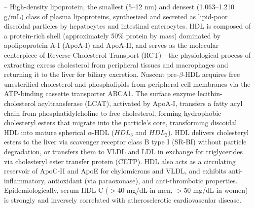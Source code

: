 -- High-density lipoprotein, the smallest (5--12 nm) and densest (1.063--1.210 g/mL) class of plasma lipoproteins, synthesized and secreted as lipid-poor discoidal particles by hepatocytes and intestinal enterocytes. HDL is composed of a protein-rich shell (approximately 50\% protein by mass) dominated by apolipoprotein A-I (ApoA-I) and ApoA-II, and serves as the molecular centerpiece of Reverse Cholesterol Transport (RCT)---the physiological process of extracting excess cholesterol from peripheral tissues and macrophages and returning it to the liver for biliary excretion. Nascent pre-$\beta$-HDL acquires free unesterified cholesterol and phospholipids from peripheral cell membranes via the ATP-binding cassette transporter ABCA1. The surface enzyme lecithin-cholesterol acyltransferase (LCAT), activated by ApoA-I, transfers a fatty acyl chain from phosphatidylcholine to free cholesterol, forming hydrophobic cholesteryl esters that migrate into the particle's core, transforming discoidal HDL into mature spherical $\alpha$-HDL ($HDL_3$ and $HDL_2$). HDL delivers cholesteryl esters to the liver via scavenger receptor class B type I (SR-BI) without particle degradation, or transfers them to VLDL and LDL in exchange for triglycerides via cholesteryl ester transfer protein (CETP). HDL also acts as a circulating reservoir of ApoC-II and ApoE for chylomicrons and VLDL, and exhibits anti-inflammatory, antioxidant (via paraoxonase), and anti-thrombotic properties. Epidemiologically, serum HDL-C ($>40$ mg/dL in men, $>50$ mg/dL in women) is strongly and inversely correlated with atherosclerotic cardiovascular disease.

